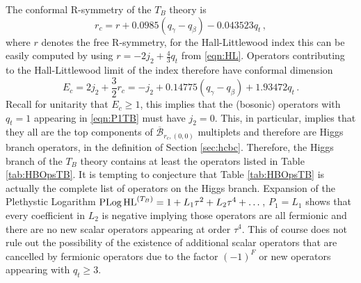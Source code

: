\documentclass[main.tex]{subfiles}
\begin{document}
The conformal R-symmetry of the $T_B$ theory is \cite{Razamat:2016dpl}
\begin{equation}
r_c=r+0.0985(q_{\gamma}-q_{\beta})-0.043523q_t\,,
\end{equation}
where $r$ denotes the free R-symmetry, for the Hall-Littlewood index this can be easily computed by using $r=-2j_2+\frac{4}{3}q_t$ from \eqref{eqn:HL}.
Operators contributing to the Hall-Littlewood limit of the index therefore have conformal dimension
\begin{equation}
E_c=2j_2+\frac{3}{2}r_c=-j_2+0.14775(q_{\gamma}-q_{\beta})+1.93472q_t\,.
\end{equation}
Recall for unitarity that $E_c\geq1$, this implies that the (bosonic) operators with $q_t=1$ appearing in \eqref{eqn:P1TB} must have $j_2=0$. This, in particular, implies that they all are the top components of $\overline{\mathcal{B}}_{r_c,(0,0)}$ multiplets and therefore are Higgs branch operators, in the definition of Section \ref{sec:hcbc}. Therefore, the Higgs branch of the $T_B$ theory contains at least the operators listed in Table \ref{tab:HBOpsTB}. It is tempting to conjecture that Table \ref{tab:HBOpsTB} is actually the complete list of operators on the Higgs branch. Expansion of the Plethystic Logarithm $\operatorname{\mathrm{PLog}}\textrm{HL}^{(T_B)}=1+L_1\tau^2+L_2\tau^4+\dots$, $P_1=L_1$ shows that every coefficient in $L_2$ is negative implying those operators are all fermionic and there are no new scalar operators appearing at order $\tau^4$. This of course does not rule out the possibility of the existence of additional scalar operators that are cancelled by fermionic operators due to the factor $(-1)^F$ or new operators appearing with $q_t\geq3$.
\end{document}
